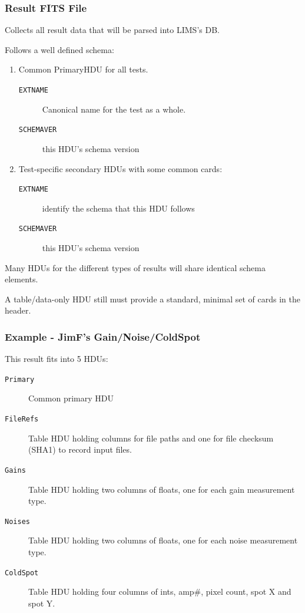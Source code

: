 \documentclass[xcolor=dvipsnames]{beamer}
\begin{document}
\begin{frame}
  \frametitle{Result FITS File}
  Collects all result data that will be parsed into LIMS's DB.

  \vspace{2mm}

  Follows a well defined schema:
  \begin{enumerate}
  \item Common PrimaryHDU for all tests.
    \begin{description}
    \item[\texttt{EXTNAME}] Canonical name for the test as a whole.
    \item[\texttt{SCHEMAVER}] this HDU's schema version
    \end{description}
  \item Test-specific secondary HDUs with some common cards:
    \begin{description}
    \item[\texttt{EXTNAME}] identify the schema that this HDU follows
    \item[\texttt{SCHEMAVER}] this HDU's schema version
    \end{description}
  \end{enumerate}

  \footnotesize

  Many HDUs for the different types of results will share identical schema elements.

  \vspace{2mm}

  A table/data-only HDU still must provide a standard, minimal set of
  cards in the header.
\end{frame}

\begin{frame}
  \frametitle{Example - JimF's Gain/Noise/ColdSpot}
  This result fits into 5 HDUs:
  \begin{description}
  \item[\texttt{Primary}] Common primary HDU
  \item[\texttt{FileRefs}] Table HDU holding columns for file paths and
    one for file checksum (SHA1) to record input files.
  \item[\texttt{Gains}] Table HDU holding two columns of floats, one
    for each gain measurement type.
  \item[\texttt{Noises}] Table HDU holding two columns of floats, one
    for each noise measurement type.
  \item[\texttt{ColdSpot}] Table HDU holding four columns of ints,
    amp\#, pixel count, spot X and spot Y.
  \end{description}

\end{frame}
\end{document}
